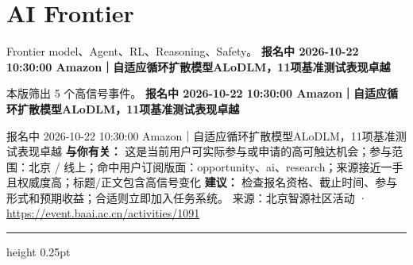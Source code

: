 \documentclass[10.5pt]{ctexart}
\begin{document}
\section*{AI Frontier}
{\color{ormuted} Frontier model、Agent、RL、Reasoning、Safety。}
\vspace{2mm}
{\LARGE\bfseries 报名中 2026-10-22 10:30:00 Amazon｜自适应循环扩散模型ALoDLM，11项基准测试表现卓越}\par
\vspace{1mm}
{\color{ormuted} 本版筛出 5 个高信号事件。}
\vspace{3mm}
{\Large\bfseries 报名中 2026-10-22 10:30:00 Amazon｜自适应循环扩散模型ALoDLM，11项基准测试表现卓越}\par
报名中 2026-10-22 10:30:00 Amazon｜自适应循环扩散模型ALoDLM，11项基准测试表现卓越
\textbf{与你有关：} 这是当前用户可实际参与或申请的高可触达机会；参与范围：北京 / 线上；命中用户订阅版面：opportunity、ai、research；来源接近一手且权威度高；标题/正文包含高信号变化
\textbf{建议：} 检查报名资格、截止时间、参与形式和预期收益；合适则立即加入任务系统。
{\footnotesize\color{ormuted} 来源：北京智源社区活动 · \url{https://event.baai.ac.cn/activities/1091}}
\vspace{4mm}
\hrule height 0.25pt
\vspace{3mm}
\end{document}
